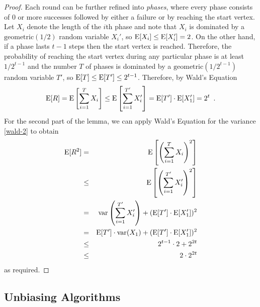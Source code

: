 \documentclass{patmorin}
\DeclareMathOperator{\var}{var}
\begin{document}
\begin{proof}
Each round can be further refined into \emph{phases}, where every
phase consists of 0 or more successes followed by either a failure or
by reaching the start vertex.  Let $X_i$ denote the length of the
$i$th phase and note that $X_i$ is dominated by a
$\mathrm{geometric}(1/2)$ random variable $X_i'$, so
$\mathrm{E}[X_i]\le\mathrm{E}[X_i'] = 2$.  On the other hand, if a phase lasts $t-1$
steps then the start vertex is reached.  Therefore, the probability of
reaching the start vertex during any particular phase is at least
$1/2^{t-1}$ and the number $T$ of phases is dominated by a
$\mathrm{geometric}(1/2^{t-1})$ random variable $T'$, so
$\mathrm{E}[T]\le\mathrm{E}[T']\le 2^{t-1}$.  Therefore, by Wald's Equation
\[
  \mathrm{E}[R] = \mathrm{E}\left[\sum_{i=1}^T X_i\right]\le \mathrm{E}\left[\sum_{i=1}^{T'}
X_i'\right] = \mathrm{E}[T']\cdot\mathrm{E}[X_1'] = 2^t \enspace .
\]
For the second part of the lemma, we can apply Wald's Equation for
the variance \eqref{wald-2} to
obtain
\begin{eqnarray*}
  \E[R^2] & = & \E\left[\left(\sum_{i=1}^T X_i\right)^2\right] \\
          &\le& \E\left[\left(\sum_{i=1}^{T'} X_i'\right)^2\right] \\
          & = & \var\left(\sum_{i=1}^{T'} X_i'\right) + (\E[T']\cdot\E[X_1'])^2 \\
          & = & \E[T']\cdot\var(X_1) + (\E[T']\cdot\E[X_1'])^2 \\
          & \le & 2^{t-1}\cdot 2 + 2^{2t} \\
          & \le & 2\cdot2^{2t}
\comment{
          & = & \E\left[\sum_{i=1}^{T'} (X_i')^2
                + \sum_{i=1}^{T'}\sum_{j=i+1}^{T'} 2X_i'X_j' \right] \\
          & = & \E\left[\sum_{i=1}^{T'} (X_i')^2\right]
                + \E\left[\sum_{i=1}^{T'}\sum_{j=i+1}^{T'} 2X_i'X_j'\right] \\
          & = & \E[T']\cdot \E\left[(X_i')^2\right]
                + \E\left[\sum_{i=1}^T\sum_{j=i+1}^{T'} 2X_i'X_j'\right] \\
          & = & \E[T']\cdot \E\left[(X_i')^2\right]
                + \E\left[\sum_{i=1}^T\sum_{j=i+1}^{T'} 2X_i'X_j'\right] \\

}
\end{eqnarray*}
as required.
\end{proof}


\subsection{Unbiasing Algorithms}
\end{document}
